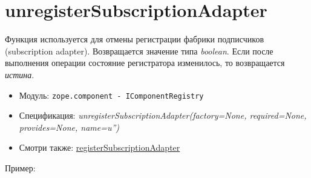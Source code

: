 \documentclass[a4paper,openany,twoside,final]{book}
\providecommand*{\DUroletitlereference}[1]{\textsl{#1}}
\begin{document}
\section*{unregisterSubscriptionAdapter%
  \label{unregistersubscriptionadapter}%
}

Функция используется для отмены регистрации фабрики подписчиков (subscription adapter).  Возвращается значение типа \DUroletitlereference{boolean}. Если после выполнения операции состояние регистратора изменилось, то возвращается \DUroletitlereference{истина}.

\begin{itemize}

\item Модуль: \texttt{zope.component - IComponentRegistry}

\item Спецификация: \DUroletitlereference{unregisterSubscriptionAdapter(factory=None, required=None, provides=None, name=u'')}

\item Смотри также: \hyperref[registersubscriptionadapter]{registerSubscriptionAdapter}

\end{itemize}

Пример:
\end{document}
